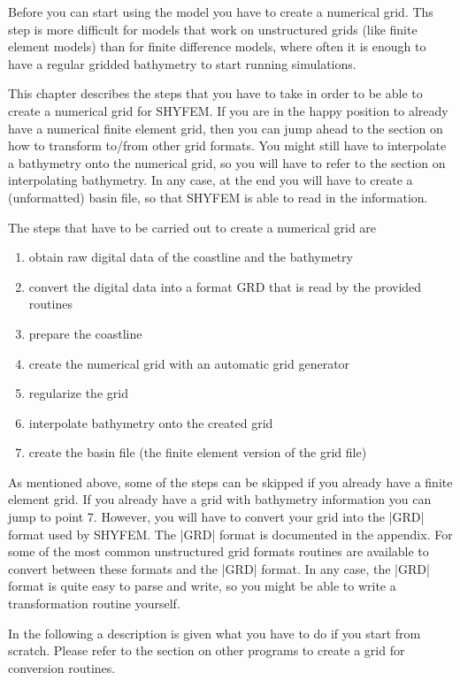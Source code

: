 
Before you can start using the model you have to create a numerical grid.
Ths step is more difficult for models that work on unstructured grids
(like finite element models) than for finite difference models, where
often it is enough to have a regular gridded bathymetry to start running
simulations.

This chapter describes the steps that you have to take in order to be able
to create a numerical grid for SHYFEM. If you are in the happy position
to already have a numerical finite element grid, then you can jump ahead
to the section on how to transform to/from other grid formats. You might
still have to interpolate a bathymetry onto the numerical grid, so you
will have to refer to the section on interpolating bathymetry. In any
case, at the end you will have to create a (unformatted) basin file,
so that SHYFEM is able to read in the information.

The steps that have to be carried out to create a numerical grid are

\begin{enumerate}

\item obtain raw digital data of the coastline and the bathymetry

\item convert the digital data into a format GRD that is read by the
	provided routines

\item prepare the coastline

\item create the numerical grid with an automatic grid generator

\item regularize the grid

\item interpolate bathymetry onto the created grid

\item create the basin file (the finite element version of the grid file)

\end{enumerate}

As mentioned above, some of the steps can be skipped if you already
have a finite element grid. If you already have a grid with bathymetry
information you can jump to point 7. However, you will have to convert
your grid into the |GRD| format used by SHYFEM. The |GRD| format is
documented in the appendix. For some of the most common unstructured grid
formats routines are available to convert between these formats and the
|GRD| format. In any case, the |GRD| format is quite easy to parse and
write, so you might be able to write a transformation routine yourself.

In the following a description is given what you have to do if you start
from scratch. Please refer to the section on other programs to create
a grid for conversion routines.


